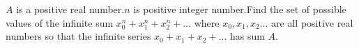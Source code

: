$A$ is a positive real number.$n$ is positive integer number.Find the set of possible values of the infinite sum $x_0^n+x_1^n+x_2^n+...$ where $x_0,x_1,x_2...$ are all positive real numbers so that the infinite series $x_0+x_1+x_2+...$ has sum $A$.